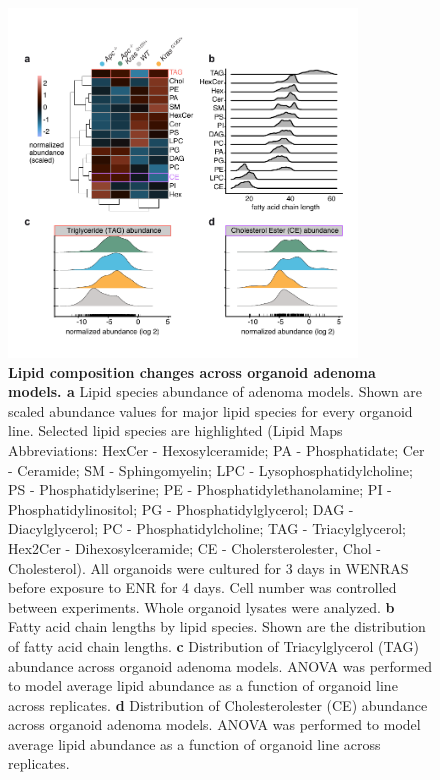 \begin{flushleft}
\begin{figure}[h]
\centering
\includegraphics[width=350,
                height=\textheight,
                keepaspectratio]{figures/adenomaprofiling/pdf/fig_1_6_8.pdf}
\caption[Lipid composition changes across organoid adenoma models]{\textbf{Lipid composition changes across organoid adenoma models. a} Lipid species abundance of adenoma models. Shown are scaled abundance values for major lipid species for every organoid line. Selected lipid species are highlighted (Lipid Maps Abbreviations: HexCer - Hexosylceramide; PA - Phosphatidate; Cer - Ceramide; SM - Sphingomyelin; LPC - Lysophosphatidylcholine; PS - Phosphatidylserine; PE - Phosphatidylethanolamine; PI - Phosphatidylinositol; PG - Phosphatidylglycerol; DAG - Diacylglycerol; PC - Phosphatidylcholine; TAG - Triacylglycerol; Hex2Cer - Dihexosylceramide; CE - Cholersterolester, Chol - Cholesterol). All organoids were cultured for 3 days in WENRAS before exposure to ENR for 4 days. Cell number was controlled between experiments. Whole organoid lysates were analyzed. 
\textbf{b} Fatty acid chain lengths by lipid species. Shown are the distribution of fatty acid chain lengths.
\textbf{c} Distribution of Triacylglycerol (TAG) abundance across organoid adenoma models. ANOVA was performed to model average lipid abundance as a function of organoid line across replicates.
\textbf{d} Distribution of Cholesterolester (CE) abundance across organoid adenoma models. ANOVA was performed to model average lipid abundance as a function of organoid line across replicates.
}
\label{fig_168}
\end{figure}
\bigbreak



\end{flushleft}
